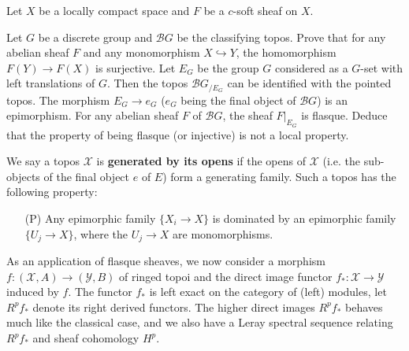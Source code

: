 \begin{example}
Let $X$ be a locally compact space and $F$ be a $c$-soft sheaf on $X$. 
\end{example}

\begin{example}
Let $G$ be a discrete group and $\mathcal{B}G$ be the classifying topos. Prove that for any abelian sheaf $F$ and any monomorphism $X\hookrightarrow Y$, the homomorphism $F(Y)\to F(X)$ is surjective. Let $E_G$ be the group $G$ considered as a $G$-set with left translations of $G$. Then the topos $\mathcal{B}G_{/E_G}$ can be identified with the pointed topos. The morphism $E_G\to e_G$ ($e_G$ being the final object of $\mathcal{B}G$) is an epimorphism. For any abelian sheaf $F$ of $\mathcal{B}G$, the sheaf $F|_{E_G}$ is flasque. Deduce that the property of being flasque (or injective) is not a local property.
\end{example}

\begin{example}
We say a topos $\mathcal{X}$ is \textbf{generated by its opens} if the opens of $\mathcal{X}$ (i.e. the sub-objects of the final object $e$ of $E$) form a generating family. Such a topos has the following property:
\begin{enumerate}
\item[(P)] Any epimorphic family $\{X_i\to X\}$ is dominated by an epimorphic family $\{U_j\to X\}$, where the $U_j\to X$ are monomorphisms.
\end{enumerate}
\end{example}

As an application of flasque sheaves, we now consider a morphism $f:(\mathcal{X},A)\to (\mathcal{Y},B)$ of ringed topoi and the direct image functor $f_*:\mathcal{X}\to \mathcal{Y}$ induced by $f$. The functor $f_*$ is left exact on the category of (left) modules, let $R^pf_*$ denote its right derived functors. The higher direct images $R^pf_*$ behaves much like the classical case, and we also have a Leray spectral sequence relating $R^pf_*$ and sheaf cohomology $H^p$.

